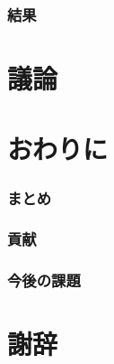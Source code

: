 \documentclass[a4paper,11pt]{jsarticle}
\begin{document}
\section{結果}

\newpage
\part{議論}

\newpage
\part{おわりに}
\section{まとめ}
\section{貢献}
\section{今後の課題}

\newpage
\part*{謝辞}
\end{document}
